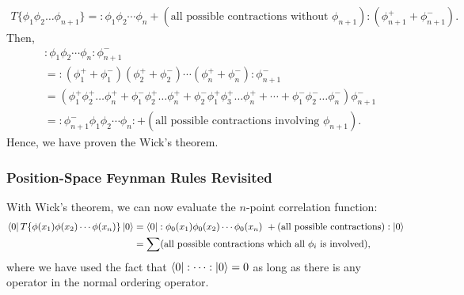 \documentclass[11pt]{article}
\theoremstyle{definition}
\begin{document}
\begin{equation}
    \begin{aligned}
        T\{\phi_1\phi_2 \dots \phi_{n+1}\}= :\phi_1\phi_2 \cdots \phi_n + (\text{all possible contractions without $\phi_{n+1}$}):(\phi^+_{n+1} + \phi^-_{n+1}).
    \end{aligned}
\end{equation}
Then,
\begin{equation}
\begin{aligned}
        &:\phi_1\phi_2 \cdots \phi_n:\phi^-_{n+1} \\
        &= :(\phi_1^+ + \phi_1^-)(\phi_2^+ + \phi_2^-) \cdots (\phi_n^+ + \phi_n^-):\phi^-_{n+1}\\
        &= (\phi_1^+\phi_2^+ \dots \phi_n^+ + \phi_1^-\phi_2^+ \dots \phi_n^+ +
        \phi_2^-\phi_1^+\phi_3^+ \dots \phi_n^+ + \cdots + \phi_1^-\phi_2^- \dots \phi_n^-)\phi^-_{n+1}\\
        &= :\phi^-_{n+1}\phi_1\phi_2 \cdots \phi_n: + (\text{all possible contractions involving $\phi_{n+1}$}).
\end{aligned} 
\end{equation}
Hence, we have proven the Wick's theorem.

\subsubsection{Position-Space Feynman Rules Revisited}
With Wick's theorem, we can now evaluate the $n$-point correlation function:
\begin{equation}
\begin{aligned}
        \bra{0}T\{\phi(x_1)\phi(x_2) \cdots \phi(x_n)\}\ket{0} &= \bra{0}:\phi_0(x_1)\phi_0(x_2) \cdots \phi_0(x_n)\ + (\text{all possible contractions}):\ket{0}\\
        &= \sum(\text{all possible contractions which all $\phi_i$ is involved}),
        \label{Eq. HD contract}
\end{aligned}
\end{equation}
where we have used the fact that $\bra{0}:\cdots:\ket{0} = 0$ as long as there is any operator in the normal ordering operator.
\end{document}
